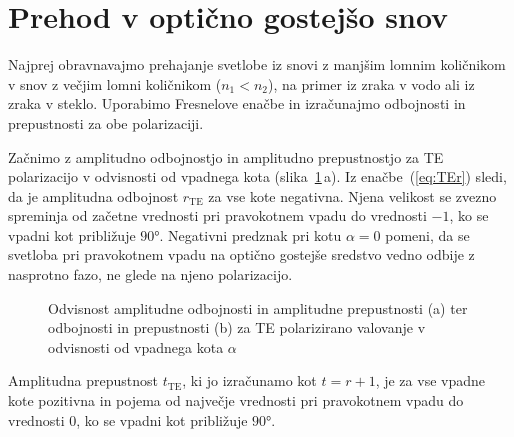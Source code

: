 \section{Prehod v optično gostejšo snov}
\label{chap:lomgost}
Najprej obravnavajmo prehajanje svetlobe iz snovi z manjšim lomnim
količnikom v snov z večjim lomni količnikom ($n_1<n_2$), na primer
iz zraka v vodo ali iz zraka v steklo. Uporabimo
Fresnelove enačbe in izračunajmo  odbojnosti in prepustnosti za obe polarizaciji. 

Začnimo z amplitudno odbojnostjo in amplitudno prepustnostjo za TE polarizacijo v odvisnosti
od vpadnega kota (slika~\ref{fig:04_redte}\,a).
Iz enačbe~(\ref{eq:TEr}) sledi, da je amplitudna odbojnost $r_\mathrm{TE}$
za vse kote negativna. Njena velikost se zvezno spreminja od začetne vrednosti
pri pravokotnem vpadu do vrednosti $-1$, ko se vpadni kot približuje $90\si{\degree}$.
Negativni predznak pri kotu $\alpha =0$ pomeni, da se svetloba pri 
pravokotnem vpadu na optično gostejše sredstvo vedno odbije z nasprotno fazo, ne 
glede na njeno polarizacijo.

\begin{figure}[ht]
\centering
\def\svgwidth{140truemm} 

\caption{Odvisnost amplitudne odbojnosti in amplitudne prepustnosti (a) ter odbojnosti in 
prepustnosti (b) za TE polarizirano valovanje v odvisnosti od vpadnega kota $\alpha$}
\label{fig:04_redte}
\end{figure}

Amplitudna prepustnost $t_\mathrm{TE}$, ki jo izračunamo kot $t=r+1$, je za vse
vpadne kote pozitivna in pojema od največje vrednosti pri pravokotnem vpadu
do vrednosti $0$, ko se vpadni kot približuje $90\si{\degree}$. 

